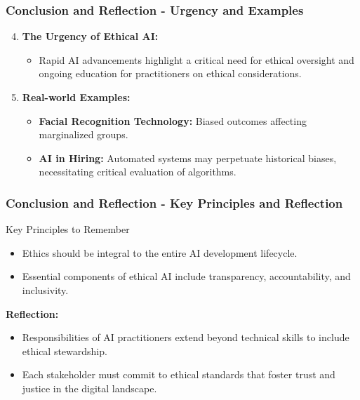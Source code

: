 \documentclass[aspectratio=169]{beamer}
\begin{document}
\begin{frame}[fragile]
  \frametitle{Conclusion and Reflection - Urgency and Examples}
  \begin{enumerate}
    \setcounter{enumi}{3} %
    \item \textbf{The Urgency of Ethical AI:}
      \begin{itemize}
        \item Rapid AI advancements highlight a critical need for ethical oversight and ongoing education for practitioners on ethical considerations.
      \end{itemize}

    \item \textbf{Real-world Examples:}
      \begin{itemize}
        \item \textbf{Facial Recognition Technology:} Biased outcomes affecting marginalized groups.
        \item \textbf{AI in Hiring:} Automated systems may perpetuate historical biases, necessitating critical evaluation of algorithms.
      \end{itemize}
  \end{enumerate}
\end{frame}

\begin{frame}[fragile]
  \frametitle{Conclusion and Reflection - Key Principles and Reflection}
  \begin{block}{Key Principles to Remember}
    \begin{itemize}
      \item Ethics should be integral to the entire AI development lifecycle.
      \item Essential components of ethical AI include transparency, accountability, and inclusivity.
    \end{itemize}
  \end{block}
  
  \textbf{Reflection:}
  \begin{itemize}
    \item Responsibilities of AI practitioners extend beyond technical skills to include ethical stewardship.
    \item Each stakeholder must commit to ethical standards that foster trust and justice in the digital landscape.
  \end{itemize}
\end{frame}
\end{document}
